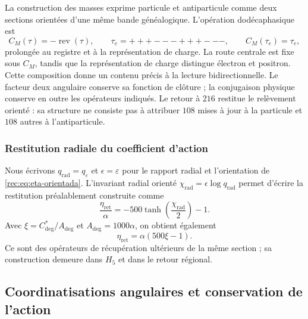 La construction des masses exprime particule et antiparticule comme deux
sections orientées d’une même bande généalogique. L’opération
dodécaphasique est
\begin{equation}
 C_M(\tau)=-\operatorname{rev}(\tau),
 \qquad \tau_e=+++---+++---,
 \qquad C_M(\tau_e)=\tau_e,
 \label{md:compos:conjugacion-dodecafasica}
\end{equation}
prolongée au registre et à la représentation de charge. La route centrale est
fixe sous $C_M$, tandis que la représentation de charge distingue électron et
positron. Cette composition donne un contenu précis à la lecture bidirectionnelle.
Le facteur deux angulaire conserve sa fonction de clôture ; la conjugaison physique
conserve en outre les opérateurs indiqués. Le retour à $216$ restitue le
relèvement orienté : sa structure ne consiste pas à attribuer $108$
mises à jour à la particule et $108$ autres à l’antiparticule.

\subsubsection{Restitution radiale du coefficient d’action}
\label{md:compos:quinientos}

Nous écrivons $q_{\mathrm{rad}}=q_\varepsilon$ et $\epsilon=\varepsilon$ pour
le rapport radial et l’orientation de \eqref{rec:eq:eta-orientada}.
L’invariant radial orienté $\chi_{\mathrm{rad}}=\epsilon\log q_{\mathrm{rad}}$
permet d’écrire la restitution préalablement construite comme
\begin{equation}
 \frac{\eta_{\mathrm{ret}}}{\alpha}
 =-500\tanh\!\left(\frac{\chi_{\mathrm{rad}}}{2}\right)-1.
 \label{md:compos:restitucion-radial}
\end{equation}
Avec $\xi=C^*_{\deg}/A_{\deg}$ et $A_{\deg}=1000\alpha$, on obtient également
\begin{equation}
 \eta_{\mathrm{ret}}=\alpha(500\xi-1).
 \label{md:compos:restitucion-xi}
\end{equation}
Ce sont des opérateurs de récupération ultérieurs de la même section ; sa construction demeure
dans $H_5$ et dans le retour régional.

\subsection{Coordinatisations angulaires et conservation de l’action}
\label{md:compos:cartas}

